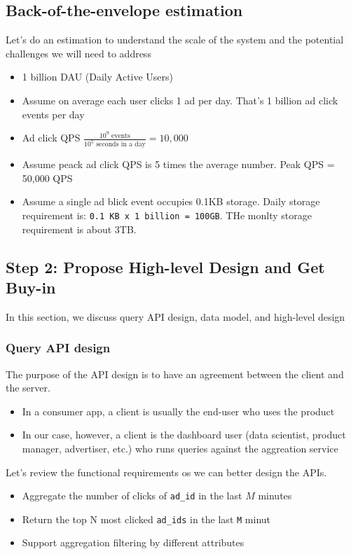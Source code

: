 \documentclass{report}
\theoremstyle{definition}
\let\oldsubsection\subsection
\let\oldsubsubsection\subsubsection
\renewcommand{\subsection}{\oldsubsection*}
\renewcommand{\subsubsection}{\oldsubsubsection*}
\begin{document}
\subsection{Back-of-the-envelope estimation}

Let's do an estimation to understand the scale of the system and the potential challenges we will need to address

\begin{itemize}
\item
1 billion DAU (Daily Active Users)
\item
Assume on average each user clicks 1 ad per day. That's 1 billion ad click events per day
\item
Ad click QPS $\frac{10^{9} \text{ events}}{10^{5} \text{ seconds in a day}} = 10,000$
\item
Assume peack ad click QPS is 5 times the average number. Peak QPS = 50,000 QPS
\item
Assume a single ad blick event occupies 0.1KB storage. Daily storage requirement is: \lstinline|0.1 KB x 1 billion = 100GB|. THe monlty storage requirement is about 3TB.
\end{itemize}

\subsection{Step 2: Propose High-level Design and Get Buy-in}

In this section, we discuss query API design, data model, and high-level design

\subsubsection{Query API design}

The purpose of the API design is to have an agreement between the client and the server.

\begin{itemize}
\item
In a consumer app, a client is usually the end-user who uses the product
\item
In our case, however, a client is the dashboard user (data scientist, product manager, advertiser, etc.) who runs queries against the aggreation service
\end{itemize}

Let's review the functional requirements os we can better design the APIs.

\begin{itemize}
\item
Aggregate the number of clicks of \lstinline|ad_id| in the last $M$ minutes
\item
Return the top N most clicked \lstinline|ad_ids| in the last \lstinline|M| minut
\item
Support aggregation filtering by different attributes
\end{itemize}
\end{document}
